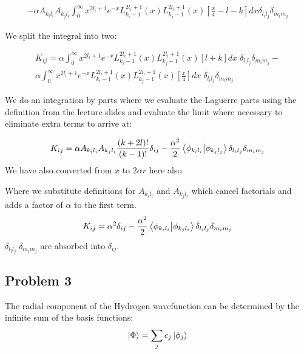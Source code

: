 \documentclass{article}
\begin{document}
    \large
    \begin{gather}
    	-\alpha A_{k_il_i} A_{k_jl_i}\int_{0}^{\infty}x^{2l_i+1}e^{-x}L^{2l_i+1}_{k_i-1}(x)L^{2l_i+1}_{k_j-1}(x)\left[\frac{x}{4} - l - k \right]dx \delta_{l_il_j} \delta_{m_im_j}
    \end{gather}
    \normalsize
    
    We split the integral into two:
    
    \large
    \begin{gather}
    	K_{ij} = \alpha \int_{0}^{\infty}x^{2l_i+1}e^{-x}L^{2l_i+1}_{k_i-1}(x)L^{2l_i+1}_{k_j-1}(x)\left[l + k\right]dx \; \delta_{l_il_j} \delta_{m_im_j}- \\
    	\alpha \int_{0}^{\infty}x^{2l_i+1}e^{-x}L^{2l_i+1}_{k_i-1}(x)L^{2l_i+1}_{k_j-1}(x)\left[\frac{x}{4}\right]dx\; \delta_{l_il_j} \delta_{m_im_j}
    \end{gather}
    \normalsize
    
    We do an integration by parts where we evaluate the Laguerre parts using the definition from the lecture slides and evaluate the limit where necessary to eliminate extra terms to arrive at:
    
    \large
    \begin{gather}
    	K_{ij} = \alpha A_{k_il_i} A_{k_jl_i} \frac{(k+2l)!}{(k-1)!}\delta_{ij} -
    	\frac{\alpha^2}{2} \braket{\phi_{k_il_i}}{\phi_{k_jl_j}}\delta_{l_il_j} \delta_{m_im_j}
    \end{gather}
    \normalsize
    We have also converted from $x$ to $2\alpha r$ here also.
    
    
    Where we substitute definitions for $A_{k_il_i}$ and  $A_{k_jl_i}$ which cancel factorials and adds a factor of $\alpha$ to the first term.
    \large
    \begin{gather}
    	K_{ij} = \alpha^2\delta_{ij} -
    	\frac{\alpha^2}{2} \braket{\phi_{k_il_i}}{\phi_{k_jl_i}}\delta_{l_il_j} \delta_{m_im_j}
    \end{gather}
    \normalsize
    $\delta_{l_il_j}\; \delta_{m_im_j}$ are absorbed into $\delta_{ij}.$


 
    
    \subsection{Problem 3}
    
    
    The radial component of the Hydrogen wavefunction can be determined by the infinite sum of the basis functions:
    \large
    \begin{gather}
    	\ket{\Phi} = \sum_{j}c_j\ket{\phi_j}
    \end{gather}
    \normalsize
    
\end{document}
